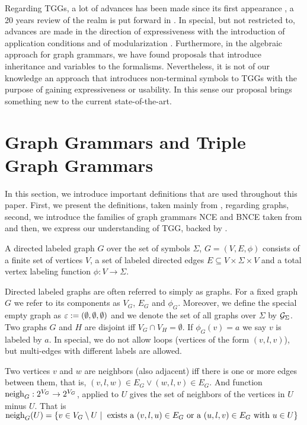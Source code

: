 \documentclass[runningheads]{llncs}
\begin{document}
Regarding TGGs, a lot of advances has been made since its first appearance \cite{schurr1994specification}, a 20 years review of the realm is put forward in \cite{anjorin201620}. In special, but not restricted to, advances are made in the direction of expressiveness with the introduction of application conditions \cite{klar2010extended} and of modularization \cite{anjorin2014modularizing}. Furthermore, in the algebraic approach for graph grammars, we have found proposals that introduce inheritance \cite{bardohl2004integrating,hermann2008typed} and variables \cite{hoffmann2005graph} to the formalisms. Nevertheless, it is not of our knowledge an approach that introduces non-terminal symbols to TGGs with the purpose of gaining expressiveness or usability. In this sense our proposal brings something new to the current state-of-the-art.

\section{Graph Grammars and Triple Graph Grammars}
\label{sec:gg-tgg}
In this section, we introduce important definitions that are used throughout this paper. First, we present the definitions, taken mainly from \cite{rozenberg1986boundary}, regarding graphs, second, we introduce the families of graph grammars NCE and BNCE taken from \cite{janssens1982graph,kim2001efficient} and then, we express our understanding of TGG, backed by \cite{schurr1994specification}.

\begin{definition}
	\label{def:graph}
	A directed labeled graph $G$ over the set of symbols $\Sigma$, $G = (V, E, \phi)$ consists of a finite set of vertices $V$, a set of labeled directed edges $E \subseteq V \times \Sigma \times V$ and a total vertex labeling function $\phi : V \to \Sigma$. 
\end{definition}

Directed labeled graphs are often referred to simply as graphs. For a fixed graph $G$ we refer to its components as $V_G$, $E_G$ and $\phi_G$. Moreover, we define the special empty graph as $\varepsilon := (\emptyset, \emptyset, \emptyset)$ and we denote the set of all graphs over $\Sigma$ by $\mathcal{G}_{\Sigma}$. Two graphs $G$ and $H$ are disjoint iff $V_G \cap V_H = \emptyset$. If $\phi_G(v) = a$ we say $v$ is labeled by $a$. In special, we do not allow loops (vertices of the form $(v,l,v)$), but multi-edges with different labels are allowed.

\begin{definition}
	Two vertices $v$ and $w$ are neighbors (also adjacent) iff there is one or more edges between them, that is, $(v,l,w) \in E_G \lor (w,l,v) \in E_G$. And function $\operatorname{neigh}_{G}: 2^{V_G} \to 2^{V_G}$, applied to $U$ gives the set of neighbors of the vertices in $U$ minus $U$. That is $\operatorname{neigh}_{G}(U) = \{ v \in V_G \setminus U \; | \; \text{ exists a } (v,l,u) \in E_G \text{ or a } (u,l,v) \in E_G \text{ with } u \in U \}$
\end{definition}
\end{document}
